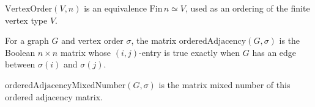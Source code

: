 \(\mathrm{VertexOrder}(V,n)\) is an equivalence \(\mathrm{Fin}\,n\simeq V\),
used as an ordering of the finite vertex type \(V\).

For a graph \(G\) and vertex order \(\sigma\), the matrix
\(\mathrm{orderedAdjacency}(G,\sigma)\) is the Boolean \(n\times n\) matrix
whose \((i,j)\)-entry is true exactly when \(G\) has an edge between
\(\sigma(i)\) and \(\sigma(j)\).

\(\mathrm{orderedAdjacencyMixedNumber}(G,\sigma)\) is the matrix mixed number of
this ordered adjacency matrix.

